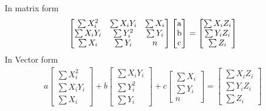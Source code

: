 \documentclass{article}
\begin{document}
In matrix form \\
\begin{gather} 
    \begin{bmatrix}
        \sum X_i^2 & \sum X_iY_i & \sum X_i \\
        \sum X_iY_i & \sum Y_i^2 & \sum Y_i\\
        \sum X_i & \sum Y_i & n
    \end{bmatrix}
    \begin{bmatrix}
    $a$ \\ $b$ \\$c$
    \end{bmatrix}
    =
    \begin{bmatrix}
    \sum X_iZ_i\\
    \sum Y_iZ_i\\
    \sum Z_i
    \end{bmatrix}
    \end{gather}
In Vector form \\
\begin{gather} 
    a
    \begin{bmatrix}
        \sum X_i^2 \\
        \sum X_iY_i\\
        \sum X_i
    \end{bmatrix}
    +
    b 
    \begin{bmatrix}
        \sum X_iY_i \\
        \sum Y_i^2\\
        \sum Y_i
    \end{bmatrix}
    +
    c
    \begin{bmatrix}
        \sum X_i \\
        \sum Y_i\\
        n 
    \end{bmatrix}
    =
    \begin{bmatrix}
    \sum X_iZ_i\\
    \sum Y_iZ_i\\
    \sum Z_i
    \end{bmatrix}
    \end{gather}
\end{document}
